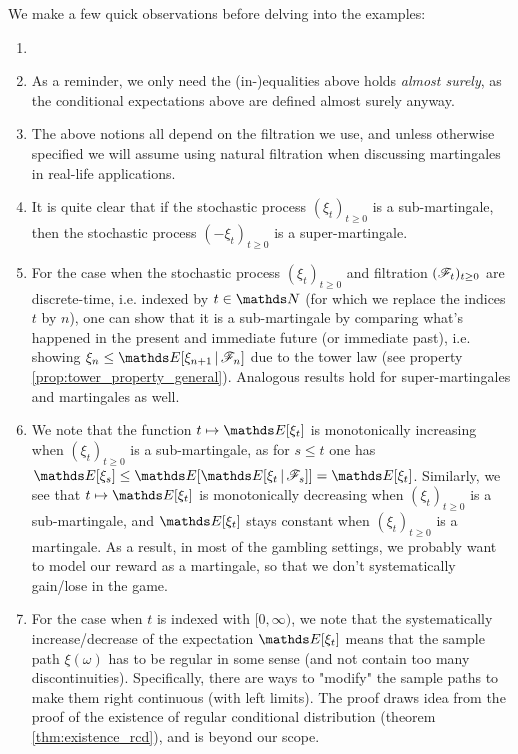 We make a few quick observations before delving into the examples:
\begin{remark} \label{rmk:martingale_first_observations}
\begin{enumerate}
    \item[]
    \item As a reminder, we only need the (in-)equalities above holds \textit{almost surely}, as the conditional expectations above are defined almost surely anyway.
    \item The above notions all depend on the filtration we use, and unless otherwise specified we will assume using natural filtration when discussing martingales in real-life applications.
    \item It is quite clear that if the stochastic process $(\xi_t)_{t\geq 0}$ is a sub-martingale, then the stochastic process $(-\xi_t)_{t\geq 0}$ is a super-martingale.
    \item For the case when the stochastic process $(\xi_t)_{t\geq 0}$ and filtration $(\mathcal{F}_t)_{t\geq 0}$ are discrete-time, i.e. indexed by $t \in \N$ (for which we replace the indices $t$ by $n$), one can show that it is a sub-martingale by comparing what's happened in the present and immediate future (or immediate past), i.e. showing $\xi_n \leq \E[\xi_{n+1} \,|\, \F_n]$ due to the tower law (see property \ref{prop:tower_property_general}). Analogous results hold for super-martingales and martingales as well.
    \item We note that the function $t \mapsto \E[\xi_t]$ is monotonically increasing when $(\xi_t)_{t\geq 0}$ is a sub-martingale, as for $s \leq t$ one has $\E[\xi_s] \leq \E[\E[\xi_t \,|\, \F_s]] = \E[\xi_t]$. Similarly, we see that $t \mapsto \E[\xi_t]$ is monotonically decreasing when $(\xi_t)_{t\geq 0}$ is a sub-martingale, and $\E[\xi_t]$ stays constant when $(\xi_t)_{t\geq 0}$ is a martingale. As a result, in most of the gambling settings, we probably want to model our reward as a martingale, so that we don't systematically gain/lose in the game.
    \item For the case when $t$ is indexed with $[0,\infty)$, we note that the systematically increase/decrease of the expectation $\E[\xi_t]$ means that the sample path $\xi(\omega)$ has to be regular in some sense (and not contain too many discontinuities). Specifically, there are ways to "modify" the sample paths to make them right continuous (with left limits). The proof draws idea from the proof of the existence of regular conditional distribution (theorem \ref{thm:existence_rcd}), and is beyond our scope.
\end{enumerate}
\end{remark}

